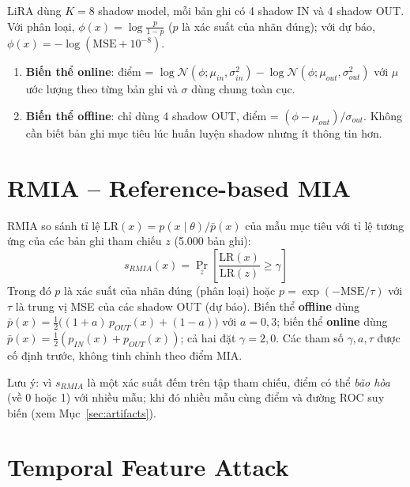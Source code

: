 \documentclass[12pt,a4paper]{report}
\begin{document}
LiRA \cite{carlini2022} dùng $K = 8$ shadow model, mỗi bản ghi có 4 shadow IN và 4 shadow OUT. Với phân loại, $\phi(x) = \log\frac{p}{1-p}$ ($p$ là xác suất của nhãn đúng); với dự báo, $\phi(x) = -\log(\mathrm{MSE} + 10^{-8})$.

\begin{enumerate}
  \item \textbf{Biến thể online}: điểm = $\log\mathcal{N}(\phi; \mu_{in}, \sigma_{in}^2) - \log\mathcal{N}(\phi; \mu_{out}, \sigma_{out}^2)$ với $\mu$ ước lượng theo từng bản ghi và $\sigma$ dùng chung toàn cục.
  \item \textbf{Biến thể offline}: chỉ dùng 4 shadow OUT, điểm = $(\phi - \mu_{out})/\sigma_{out}$. Không cần biết bản ghi mục tiêu lúc huấn luyện shadow nhưng ít thông tin hơn.
\end{enumerate}

\section{RMIA -- Reference-based MIA}

RMIA \cite{zarifzadeh2024} so sánh tỉ lệ $\mathrm{LR}(x) = p(x \mid \theta)/\bar{p}(x)$ của mẫu mục tiêu với tỉ lệ tương ứng của các bản ghi tham chiếu $z$ (5.000 bản ghi):
\[
  s_{RMIA}(x) = \Pr_{z}\!\left[\frac{\mathrm{LR}(x)}{\mathrm{LR}(z)} \ge \gamma\right]
\]
Trong đó $p$ là xác suất của nhãn đúng (phân loại) hoặc $p = \exp(-\mathrm{MSE}/\tau)$ với $\tau$ là trung vị MSE của các shadow OUT (dự báo). Biến thể \textbf{offline} dùng $\bar{p}(x) = \tfrac{1}{2}\big((1+a)\,p_{OUT}(x) + (1-a)\big)$ với $a = 0{,}3$; biến thể \textbf{online} dùng $\bar{p}(x) = \tfrac{1}{2}(p_{IN}(x) + p_{OUT}(x))$; cả hai đặt $\gamma = 2{,}0$. Các tham số $\gamma, a, \tau$ được cố định trước, không tinh chỉnh theo điểm MIA.

Lưu ý: vì $s_{RMIA}$ là một xác suất đếm trên tập tham chiếu, điểm có thể \textit{bão hòa} (về 0 hoặc 1) với nhiều mẫu; khi đó nhiều mẫu cùng điểm và đường ROC suy biến (xem Mục~\ref{sec:artifacts}).

\section{Temporal Feature Attack}
\label{sec:temporal}
\end{document}
